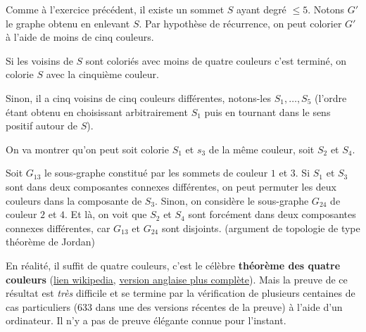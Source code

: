 \begin{exo}
\begin{sol}
\begin{enumerate}
Comme à l'exercice précédent, il existe un sommet $S$ ayant degré $\leq 5$. Notons $G'$ le graphe obtenu en enlevant $S$. Par hypothèse de récurrence, on peut colorier $G'$ à l'aide de moins de cinq couleurs.

Si les voisins de $S$ sont coloriés avec moins de quatre couleurs c'est terminé, on colorie $S$ avec la cinquième couleur. 

Sinon, il a cinq voisins de cinq couleurs différentes, notons-les $S_1, \dots, S_5$ (l'ordre étant obtenu en choisissant arbitrairement $S_1$ puis en tournant dans le sens positif autour de $S$).

On va montrer qu'on peut soit colorie $S_1$ et $s_3$ de la même couleur, soit $S_2$ et $S_4$.

Soit $G_{13}$ le sous-graphe constitué par les sommets de couleur $1$ et $3$. Si $S_1$ et $S_3$ sont dans deux composantes connexes différentes, on peut permuter les deux couleurs dans la composante de $S_3$.
Sinon, on considère le sous-graphe $G_{24}$ de couleur $2$ et $4$. Et là, on voit que $S_2$ et $S_4$ sont forcément dans deux composantes connexes différentes, car $G_{13}$ et $G_{24}$ sont disjoints. (argument de topologie de type théorème de Jordan)
\end{enumerate}
\end{sol}
\end{exo}

\begin{mdframed}
En réalité, il suffit de quatre couleurs, c'est le célèbre \textbf{théorème des quatre couleurs} (\href{https://fr.wikipedia.org/wiki/Th%C3%A9or%C3%A8me_des_quatre_couleurs}{lien wikipedia}, \href{https://en.wikipedia.org/wiki/Four_color_theorem}{version anglaise plus complète}).
Mais la preuve de ce résultat est \emph{très} difficile et se termine par la vérification de plusieurs centaines de cas particuliers (633 dans une des versions récentes de la preuve) à l'aide d'un ordinateur. Il n'y a pas de preuve élégante connue pour l'instant.
\end{mdframed}

